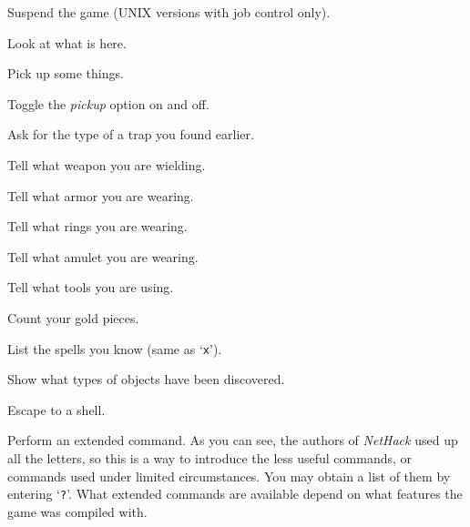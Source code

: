 \item[\tb{\^{}Z}]
Suspend the game (UNIX versions with job control only).
\item[\tb{:}]
Look at what is here.
\item[\tb{,}]
Pick up some things.
\item[\tb{@}]
Toggle the
{\it pickup\/} option on and off.
\item[\tb{\^{}}]
Ask for the type of a trap you found earlier.
\item[\tb{)}]
Tell what weapon you are wielding.
\item[\tb{[}]
Tell what armor you are wearing.
\item[\tb{=}]
Tell what rings you are wearing.
\item[\tb{"}]
Tell what amulet you are wearing.
\item[\tb{(}]
Tell what tools you are using.
\item[\tb{\$}]
Count your gold pieces.
\item[\tb{+}]
List the spells you know (same as `{\tt x}').
\item[\tb{$\backslash$}]
Show what types of objects have been discovered.
\item[\tb{!}]
Escape to a shell.
\item[\tb{\#}]
Perform an extended command.  As you can see, the authors of {\it NetHack\/}
used up all the letters, so this is a way to introduce the less useful
commands, or commands used under limited circumstances.  You may obtain a
list of them by entering `{\tt ?}'.  What extended commands are available
depend on what features the game was compiled with.
\elist

